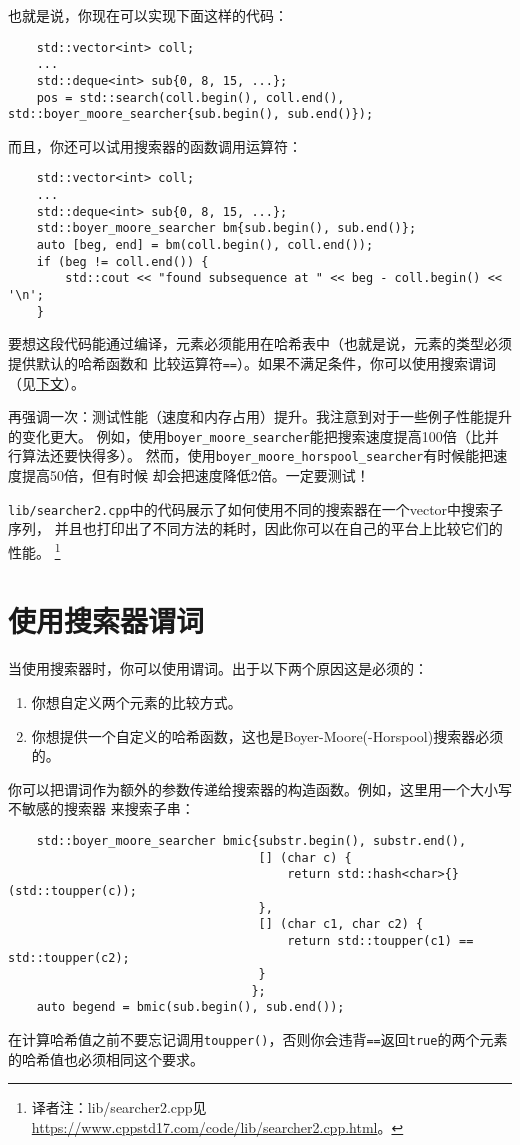 也就是说，你现在可以实现下面这样的代码：
\begin{lstlisting}
    std::vector<int> coll;
    ...
    std::deque<int> sub{0, 8, 15, ...};
    pos = std::search(coll.begin(), coll.end(), std::boyer_moore_searcher{sub.begin(), sub.end()});
\end{lstlisting}
而且，你还可以试用搜索器的函数调用运算符：
\begin{lstlisting}
    std::vector<int> coll;
    ...
    std::deque<int> sub{0, 8, 15, ...};
    std::boyer_moore_searcher bm{sub.begin(), sub.end()};
    auto [beg, end] = bm(coll.begin(), coll.end());
    if (beg != coll.end()) {
        std::cout << "found subsequence at " << beg - coll.begin() << '\n';
    }
\end{lstlisting}
要想这段代码能通过编译，元素必须能用在哈希表中（也就是说，元素的类型必须提供默认的哈希函数和
比较运算符\texttt{==}）。如果不满足条件，你可以使用搜索谓词（见\hyperref[ch24.3]{下文}）。

再强调一次：测试性能（速度和内存占用）提升。我注意到对于一些例子性能提升的变化更大。
例如，使用\texttt{boyer\_moore\_searcher}能把搜索速度提高100倍（比并行算法还要快得多）。
然而，使用\texttt{boyer\_moore\_horspool\_searcher}有时候能把速度提高50倍，但有时候
却会把速度降低2倍。一定要测试！

\texttt{lib/searcher2.cpp}中的代码展示了如何使用不同的搜索器在一个vector中搜索子序列，
并且也打印出了不同方法的耗时，因此你可以在自己的平台上比较它们的性能。
\footnote{译者注：lib/searcher2.cpp见\url{https://www.cppstd17.com/code/lib/searcher2.cpp.html}。}

\section{使用搜索器谓词}\label{ch24.3}
当使用搜索器时，你可以使用谓词。出于以下两个原因这是必须的：
\begin{enumerate}
    \item 你想自定义两个元素的比较方式。
    \item 你想提供一个自定义的哈希函数，这也是Boyer-Moore(-Horspool)搜索器必须的。
\end{enumerate}
你可以把谓词作为额外的参数传递给搜索器的构造函数。例如，这里用一个大小写不敏感的搜索器
来搜索子串：
\begin{lstlisting}
    std::boyer_moore_searcher bmic{substr.begin(), substr.end(),
                                   [] (char c) {
                                       return std::hash<char>{}(std::toupper(c));
                                   },
                                   [] (char c1, char c2) {
                                       return std::toupper(c1) == std::toupper(c2);
                                   }
                                  };
    auto begend = bmic(sub.begin(), sub.end());
\end{lstlisting}
在计算哈希值之前不要忘记调用\texttt{toupper()}，否则你会违背\texttt{==}返回\texttt{true}的两个元素
的哈希值也必须相同这个要求。

